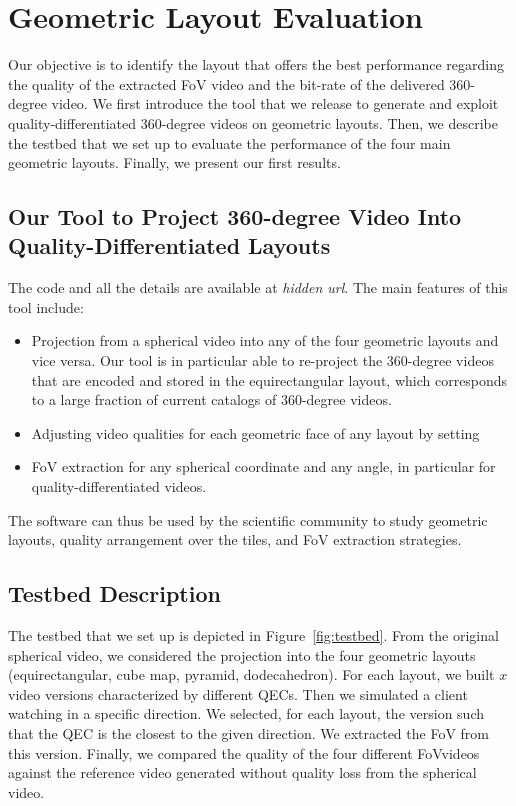 \section{Geometric Layout Evaluation}

Our objective is to identify the layout that offers the best performance regarding the quality of 
the extracted \ac{FoV} video and the bit-rate of the delivered 360-degree video. We first introduce 
the tool that we release to generate and exploit quality-differentiated
360-degree videos on geometric layouts. Then, we describe the testbed that we set up to evaluate the
performance of the four main geometric layouts. Finally, we present our first results.

\subsection{Our Tool to Project 360-degree Video Into Quality-Differentiated Layouts}

The code and all the details are available at \textit{hidden url}. The main features of this tool include:
\begin{itemize}
\item Projection from a spherical video into any of the four geometric layouts and vice versa. Our tool is in 
particular able to re-project the 360-degree videos that are encoded and stored in the equirectangular layout,
which corresponds to a large fraction of current catalogs of 360-degree videos. 
\item Adjusting video qualities for each geometric face of any layout by setting 
\item \ac{FoV} extraction for any spherical coordinate and any angle, in particular for quality-differentiated videos.
\end{itemize}

The software can thus be used by the scientific community to study geometric layouts, quality arrangement over the tiles, and \ac{FoV} extraction strategies.

\subsection{Testbed Description}

The testbed that we
set up is depicted in Figure~\ref{fig:testbed}. From the original spherical video, we considered the 
projection 
into the four geometric layouts (equirectangular, cube map, pyramid, dodecahedron). For 
each layout, we built
$x$ video versions characterized by different \acp{QEC}. Then we simulated
a client watching in a specific direction. We selected, for each layout, the version such that the \ac{QEC}
is the closest to the given direction. We extracted the \ac{FoV} from this version. Finally, we compared
the quality of the four different \ac{FoV}videos against the reference video generated
without quality loss from the spherical video.

